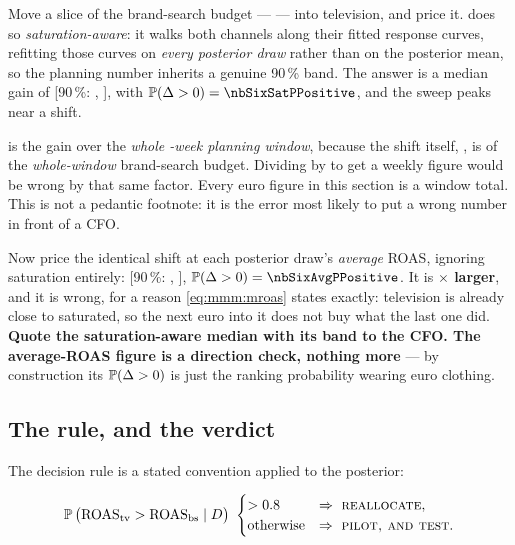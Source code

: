 

Move a \pc{\nbSixShiftPct} slice of the brand-search budget --- \eur{\nbSixShiftEur} --- into
television, and price it.  does so \emph{saturation-aware}: it walks both
channels along their fitted response curves, refitting those curves on \emph{every posterior draw}
rather than on the posterior mean, so the planning number inherits a genuine 90\,\% band. The
answer is a median gain of \eur{\nbSixSatDelta} [90\,\%: \eur{\nbSixSatDeltaLo},
\eur{\nbSixSatDeltaHi}], with $\Prob(\Delta > 0) = \nbSixSatPPositive$, and the sweep peaks near a
\pc{\nbSixBestShift} shift.

\begin{remark}
\eur{\nbSixSatDelta} is the gain over the \emph{whole \nbSixNWeeks-week planning window}, because
the shift itself, \eur{\nbSixShiftEur}, is \pc{\nbSixShiftPct} of the \emph{whole-window}
brand-search budget. Dividing by \nbSixNWeeks{} to get a weekly figure would be wrong by that same
factor. Every euro figure in this section is a window total. This is not a pedantic footnote: it
is the error most likely to put a wrong number in front of a CFO.
\end{remark}

Now price the identical shift at each posterior draw's \emph{average} ROAS, ignoring saturation
entirely: \eur{\nbSixAvgDelta} [90\,\%: \eur{\nbSixAvgDeltaLo}, \eur{\nbSixAvgDeltaHi}],
$\Prob(\Delta > 0) = \nbSixAvgPPositive$. It is \textbf{\nbSixAvgOverSat$\times$ larger}, and it is
wrong, for a reason \cref{eq:mmm:mroas} states exactly: television is already close to saturated,
so the next euro into it does not buy what the last one did. \textbf{Quote the saturation-aware
median with its band to the CFO. The average-ROAS figure is a direction check, nothing more} ---
by construction its $\operatorname{\mathbb{P}}(\Delta > 0)$ is just the ranking probability wearing euro clothing.

\subsection*{The rule, and the verdict}

The decision rule is a stated convention applied to the posterior:

\begin{equation}
  \operatorname{\mathbb{P}}\big(\text{ROAS}_{\text{tv}} > \text{ROAS}_{\text{bs}} \mid D\big)\ \begin{cases}
    > 0.8 & \Rightarrow\ \textsc{reallocate},\\
    \text{otherwise} & \Rightarrow\ \textsc{pilot, and test}.
  \end{cases}
  \label{eq:mmm:rule}
\end{equation}


